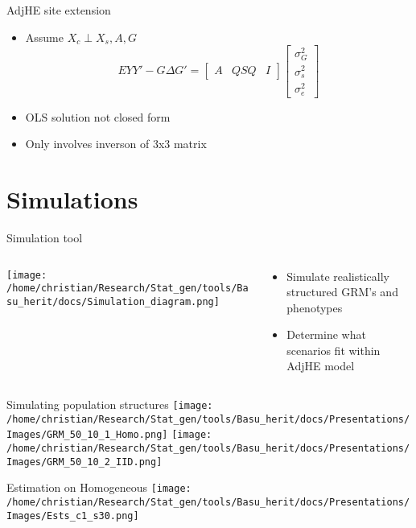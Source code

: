 \documentclass[
  ignorenonframetext,
]{beamer}
\begin{document}
\begin{frame}{AdjHE site extension}
\begin{itemize}
	\item Assume $X_c \perp X_s, A, G$
	$$	EYY' - G\Delta G' = 
	\begin{bmatrix}
	A & QSQ & I
	\end{bmatrix}\begin{bmatrix}
	\sigma_G^2 \\ \sigma_s^2 \\ \sigma_e^2
	\end{bmatrix}$$
	\item OLS solution not closed form
	\item Only involves inverson of 3x3 matrix
	\end{itemize}
\end{frame}


\section{Simulations}
\begin{frame}{Simulation tool}
\begin{columns}
\begin{column}{0.7\textwidth}
\texttt{[image: /home/christian/Research/Stat\_gen/tools/Basu\_herit/docs/Simulation\_diagram.png]}
\end{column}
\begin{column}{0.3\textwidth}
\begin{itemize}
	\item Simulate realistically structured GRM's and phenotypes
	\item Determine what scenarios fit within AdjHE model
\end{itemize}
\end{column}
\end{columns}
\end{frame}


\begin{frame}{Simulating population structures}
\texttt{[image: /home/christian/Research/Stat\_gen/tools/Basu\_herit/docs/Presentations/Images/GRM\_50\_10\_1\_Homo.png]}
\texttt{[image: /home/christian/Research/Stat\_gen/tools/Basu\_herit/docs/Presentations/Images/GRM\_50\_10\_2\_IID.png]}
\end{frame}


\begin{frame}{Estimation on Homogeneous}
\centering
\texttt{[image: /home/christian/Research/Stat\_gen/tools/Basu\_herit/docs/Presentations/Images/Ests\_c1\_s30.png]}
\end{frame}
\end{document}
